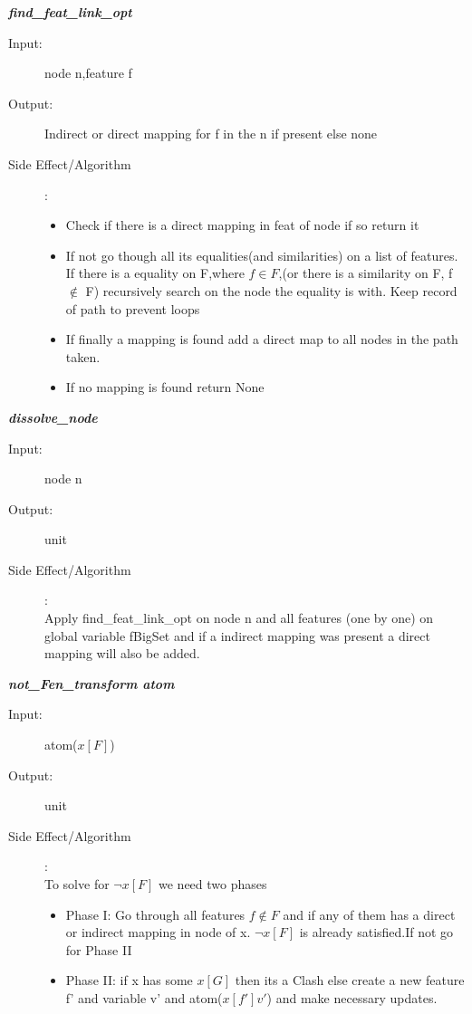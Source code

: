 \documentclass[12pt]{article}
\begin{document}
\begin{description}
\item \textbf{\textit{find\_feat\_link\_opt}}
\begin{description}
    \item[Input:] node n,feature f
    \item[Output:] Indirect or direct mapping for f in the n if present else none
    \item[Side Effect/Algorithm]:
    \begin{itemize}
        \item Check if there is a direct mapping in feat of node if so return it
        \item If not go though all its equalities(and similarities) on a list of features. If there is a equality on F,where $f \in F$,(or there is a similarity on F, f $\not\in$ F) recursively search on the node the equality is with. Keep record of path to prevent loops
        \item If finally a mapping is found add a direct map to all nodes in the path taken.
        \item If no mapping is found return None
    \end{itemize}
\end{description}


\item \textbf{\textit{dissolve\_node}}
\begin{description}
    \item[Input:] node n
    \item[Output:] unit
    \item[Side Effect/Algorithm]:\\Apply find\_feat\_link\_opt on node n and all features (one by one) on global variable fBigSet and if a indirect mapping was present a direct mapping will also be added.\\
\end{description}



\item \textbf{\textit{not\_Fen\_transform atom}}
\begin{description}
    \item[Input:] atom($x[F]$)
    \item[Output:] unit
    \item[Side Effect/Algorithm]:\\To solve for $\lnot x[F]$ we need two phases
    \begin{itemize}
        \item Phase I: Go through all features $f \not\in F$ and if any of them has a direct or indirect mapping in node of x. $\lnot x[F]$ is already satisfied.If not go for Phase II
        \item Phase II: if x has some $x[G]$ then its a Clash else create a new feature f' and variable v' and atom($x[f']v'$) and make necessary updates.
    \end{itemize}
\end{description}


\end{description}
\end{document}
